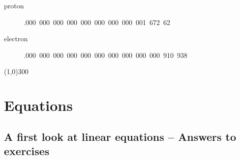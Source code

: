 \begin{description}
\item[\quad proton \quad] .000~000~000~000~000~000~000~000~001~672~62 
\item[\quad electron \quad] .000~000~000~000~000~000~000~000~000~000~910~938
\end{description}

\begin{center}
\line(1,0){300} %
\end{center}


\section{Equations} %

\bigskip

\subsection{A first look at linear equations -- Answers to exercises} %

